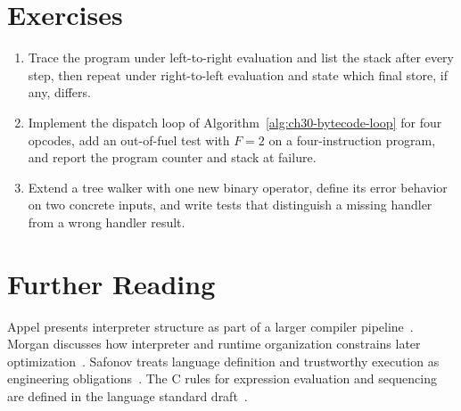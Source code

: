 \section{Exercises}\label{sec:ch30-exercises}

\begin{enumerate}
\item Trace the program  under left-to-right evaluation and list the stack after every step, then repeat under right-to-left evaluation and state which final store, if any, differs.\label{ex:ch30-eval-order}
\item Implement the dispatch loop of Algorithm~\ref{alg:ch30-bytecode-loop} for four opcodes, add an out-of-fuel test with $F = 2$ on a four-instruction program, and report the program counter and stack at failure.\label{ex:ch30-fuel-test}
\item Extend a tree walker with one new binary operator, define its error behavior on two concrete inputs, and write tests that distinguish a missing handler from a wrong handler result.\label{ex:ch30-new-operator}
\end{enumerate}

\section{Further Reading}\label{sec:ch30-reading}

Appel presents interpreter structure as part of a larger compiler pipeline~\cite{appel-1998-modern}.
Morgan discusses how interpreter and runtime organization constrains later optimization~\cite{morgan-1998-optimizing}.
Safonov treats language definition and trustworthy execution as engineering obligations~\cite{safonov-2010-trustworthy}.
The C rules for expression evaluation and sequencing are defined in the language standard draft~\cite{wg14-2011-c11}.
